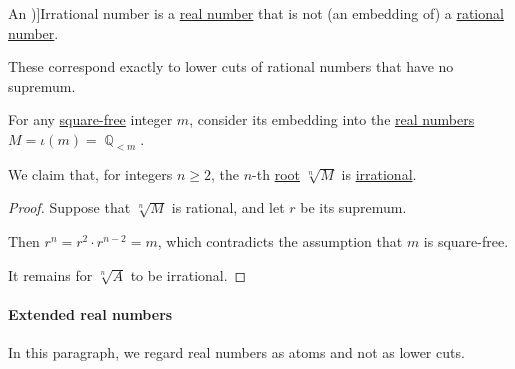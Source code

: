\begin{definition}\label{def:irrational_number}
  An \term[ru=иррациональное число (\cite[def. II.1]{Александров1977Топология})]{Irrational number} is a \hyperref[def:real_numbers]{real number} that is not (an embedding of) a \hyperref[def:rational_numbers]{rational number}.
\end{definition}
\begin{comments}
  \item These correspond exactly to lower cuts of rational numbers that have no supremum.
\end{comments}

\begin{proposition}\label{thm:real_nth_root_is_irrational}
  For any \hyperref[def:square_free_element]{square-free} integer \( m \), consider its embedding into the \hyperref[def:real_numbers]{real numbers} \( M = \iota(m) = \BbbQ_{<m} \).

  We claim that, for integers \( n \geq 2 \), the \( n \)-th \hyperref[def:real_nth_root]{root} \( \sqrt[n]{ M } \) is \hyperref[def:irrational_numbers]{irrational}.
\end{proposition}
\begin{proof}
  Suppose that \( \sqrt[n]{ M } \) is rational, and let \( r \) be its supremum.

  Then \( r^n = r^2 \cdot r^{n-2} = m \), which contradicts the assumption that \( m \) is square-free.

  It remains for \( \sqrt[n]{ A } \) to be irrational.
\end{proof}

\paragraph{Extended real numbers}\hfill

In this paragraph, we regard real numbers as atoms and not as lower cuts.

